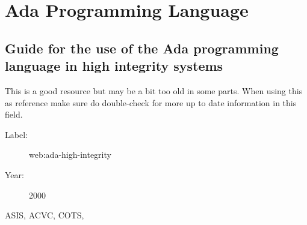 \chapter{Ada Programming Language}

\section{Guide for the use of the Ada programming language in high integrity
systems}

This is a good resource but may be a bit too old in some parts. When using this
as reference make sure do double-check for more up to date information in this
field.

\begin{description}
    \item[Label:] web:ada-high-integrity \cite{web:ada-high-integrity}
    \item[Year:] 2000
\end{description}

ASIS,
ACVC,
COTS,

